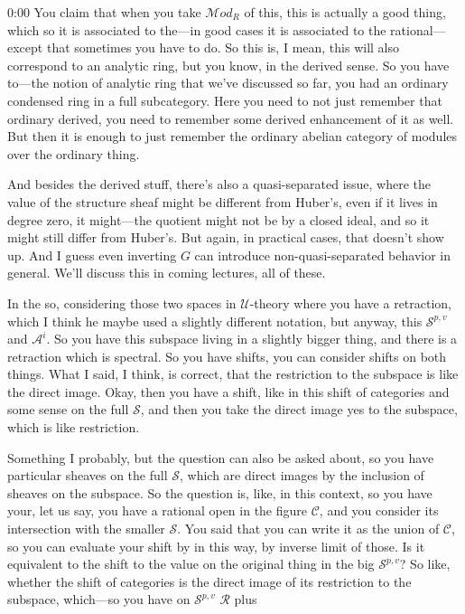 \begin{unfinished}{0:00}
You claim that when you take $\mathcal{M}od_R$ of this, this is actually a good thing, which so it is associated to the---in good cases it is associated to the rational---except that sometimes you have to do. So this is, I mean, this will also correspond to an analytic ring, but you know, in the derived sense. So you have to---the notion of analytic ring that we've discussed so far, you had an ordinary condensed ring in a full subcategory. Here you need to not just remember that ordinary derived, you need to remember some derived enhancement of it as well. But then it is enough to just remember the ordinary abelian category of modules over the ordinary thing.

And besides the derived stuff, there's also a quasi-separated issue, where the value of the structure sheaf might be different from Huber's, even if it lives in degree zero, it might---the quotient might not be by a closed ideal, and so it might still differ from Huber's. But again, in practical cases, that doesn't show up. And I guess even inverting $G$ can introduce non-quasi-separated behavior in general. We'll discuss this in coming lectures, all of these.

In the so, considering those two spaces in $\mathcal{U}$-theory where you have a retraction, which I think he maybe used a slightly different notation, but anyway, this $\mathcal{S}^{p,v}$ and $\mathcal{A}^{i}$. So you have this subspace living in a slightly bigger thing, and there is a retraction which is spectral. So you have shifts, you can consider shifts on both things. What I said, I think, is correct, that the restriction to the subspace is like the direct image. Okay, then you have a shift, like in this shift of categories and some sense on the full $\mathcal{S}$, and then you take the direct image yes to the subspace, which is like restriction.

Something I probably, but the question can also be asked about, so you have particular sheaves on the full $\mathcal{S}$, which are direct images by the inclusion of sheaves on the subspace. So the question is, like, in this context, so you have your, let us say, you have a rational open in the figure $\mathcal{C}$, and you consider its intersection with the smaller $\mathcal{S}$. You said that you can write it as the union of $\mathcal{C}$, so you can evaluate your shift by in this way, by inverse limit of those. Is it equivalent to the shift to the value on the original thing in the big $\mathcal{S}^{p,v}$? So like, whether the shift of categories is the direct image of its restriction to the subspace, which---so you have on $\mathcal{S}^{p,v}$ $\mathcal{R}$ plus

\end{unfinished}